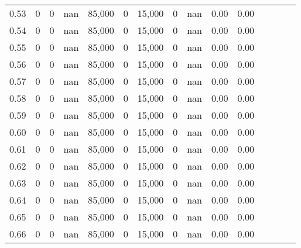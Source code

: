 \begin{tabular}{rrrcrrrrrrrrrrr}
0.53 &      0 &    0 &                                        nan &  85,000 &       0 &  15,000 &       0 &   nan &  0.00 &                         0.00 \\
0.54 &      0 &    0 &                                        nan &  85,000 &       0 &  15,000 &       0 &   nan &  0.00 &                         0.00 \\
0.55 &      0 &    0 &                                        nan &  85,000 &       0 &  15,000 &       0 &   nan &  0.00 &                         0.00 \\
0.56 &      0 &    0 &                                        nan &  85,000 &       0 &  15,000 &       0 &   nan &  0.00 &                         0.00 \\
0.57 &      0 &    0 &                                        nan &  85,000 &       0 &  15,000 &       0 &   nan &  0.00 &                         0.00 \\
0.58 &      0 &    0 &                                        nan &  85,000 &       0 &  15,000 &       0 &   nan &  0.00 &                         0.00 \\
0.59 &      0 &    0 &                                        nan &  85,000 &       0 &  15,000 &       0 &   nan &  0.00 &                         0.00 \\
0.60 &      0 &    0 &                                        nan &  85,000 &       0 &  15,000 &       0 &   nan &  0.00 &                         0.00 \\
0.61 &      0 &    0 &                                        nan &  85,000 &       0 &  15,000 &       0 &   nan &  0.00 &                         0.00 \\
0.62 &      0 &    0 &                                        nan &  85,000 &       0 &  15,000 &       0 &   nan &  0.00 &                         0.00 \\
0.63 &      0 &    0 &                                        nan &  85,000 &       0 &  15,000 &       0 &   nan &  0.00 &                         0.00 \\
0.64 &      0 &    0 &                                        nan &  85,000 &       0 &  15,000 &       0 &   nan &  0.00 &                         0.00 \\
0.65 &      0 &    0 &                                        nan &  85,000 &       0 &  15,000 &       0 &   nan &  0.00 &                         0.00 \\
0.66 &      0 &    0 &                                        nan &  85,000 &       0 &  15,000 &       0 &   nan &  0.00 &                         0.00 \\

\end{tabular}
